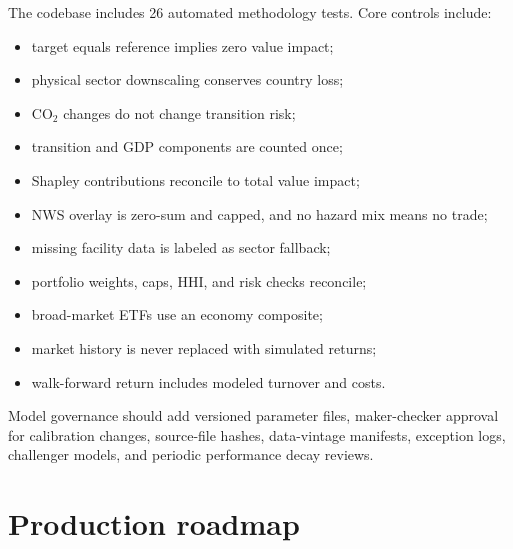 \documentclass[10pt]{article}
\begin{document}
The codebase includes 26 automated methodology tests. Core controls include:
\begin{itemize}
  \item target equals reference implies zero value impact;
  \item physical sector downscaling conserves country loss;
  \item CO$_2$ changes do not change transition risk;
  \item transition and GDP components are counted once;
  \item Shapley contributions reconcile to total value impact;
  \item NWS overlay is zero-sum and capped, and no hazard mix means no trade;
  \item missing facility data is labeled as sector fallback;
  \item portfolio weights, caps, HHI, and risk checks reconcile;
  \item broad-market ETFs use an economy composite;
  \item market history is never replaced with simulated returns;
  \item walk-forward return includes modeled turnover and costs.
\end{itemize}

Model governance should add versioned parameter files, maker-checker approval for calibration changes, source-file hashes, data-vintage manifests, exception logs, challenger models, and periodic performance decay reviews.

\section{Production roadmap}
\end{document}
